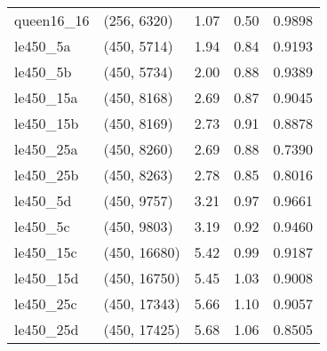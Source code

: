 \begin{tabular}{llrrr}
queen16\_16 &  (256, 6320) &      1.07 &     0.50 & 0.9898 \\
  le450\_5a &  (450, 5714) &      1.94 &     0.84 & 0.9193 \\
  le450\_5b &  (450, 5734) &      2.00 &     0.88 & 0.9389 \\
 le450\_15a &  (450, 8168) &      2.69 &     0.87 & 0.9045 \\
 le450\_15b &  (450, 8169) &      2.73 &     0.91 & 0.8878 \\
 le450\_25a &  (450, 8260) &      2.69 &     0.88 & 0.7390 \\
 le450\_25b &  (450, 8263) &      2.78 &     0.85 & 0.8016 \\
  le450\_5d &  (450, 9757) &      3.21 &     0.97 & 0.9661 \\
  le450\_5c &  (450, 9803) &      3.19 &     0.92 & 0.9460 \\
 le450\_15c & (450, 16680) &      5.42 &     0.99 & 0.9187 \\
 le450\_15d & (450, 16750) &      5.45 &     1.03 & 0.9008 \\
 le450\_25c & (450, 17343) &      5.66 &     1.10 & 0.9057 \\
 le450\_25d & (450, 17425) &      5.68 &     1.06 & 0.8505 \\
\bottomrule
\end{tabular}
